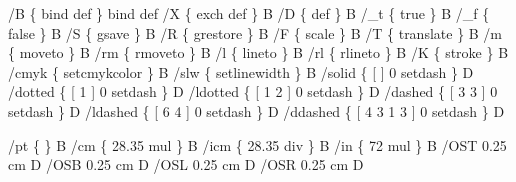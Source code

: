 \documentclass[11pt]{article}
\def\nwendcode{\endtrivlist \endgroup} %
\let\nwdocspar=\par                    %
\begin{document}

\nwenddocs{}\endmoddef
%
/B \{ bind def \} bind def       %
/X \{ exch def \} B              %
/D \{ def      \} B              %
/_t \{ true  \} B                %
/_f \{ false \} B                %
/S \{ gsave     \} B             %
/R \{ grestore  \} B             %
/F \{ scale     \} B             %
/T \{ translate \} B             %
/m  \{ moveto  \} B              %
/rm \{ rmoveto \} B              %
/l  \{ lineto  \} B              %
/rl \{ rlineto \} B              %
/K  \{ stroke  \} B              %
/cmyk \{ setcmykcolor \} B       %
/slw  \{ setlinewidth \} B       %
/solid   \{ [     ] 0 setdash \} D  %
/dotted  \{ [ 1   ] 0 setdash \} D  %
/ldotted \{ [ 1 2 ] 0 setdash \} D  %
/dashed  \{ [ 3 3 ] 0 setdash \} D  %
/ldashed \{ [ 6 4 ] 0 setdash \} D  %
/ddashed \{ [ 4 3 1 3              %
                 ] 0 setdash \} D  %
%
%
\nwendcode{}\nwdocspar



\nwenddocs{}\endmoddef
%
/pt   \{           \} B  %
/cm   \{ 28.35 mul \} B  %
/icm  \{ 28.35 div \} B  %
/in   \{ 72    mul \} B  %
/OST 0.25 cm D  %
/OSB 0.25 cm D  %
/OSL 0.25 cm D  %
/OSR 0.25 cm D  %
%
%
\eatline
{}\nwendcode{}\nwdocspar
\end{document}

